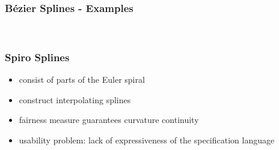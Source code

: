 \documentclass[mathserif]{beamer}
\begin{document}
		\begin{frame}
			\frametitle{Bézier Splines - Examples}
			\\
		\end{frame}

		\begin{frame}
			\frametitle{Spiro Splines}
			\begin{itemize}
				\item consist of parts of the Euler spiral
				\item construct interpolating splines
				\item fairness measure guarantees curvature continuity
				\item usability problem: lack of expressiveness of the specification language
			\end{itemize}
		\end{frame}
\end{document}
